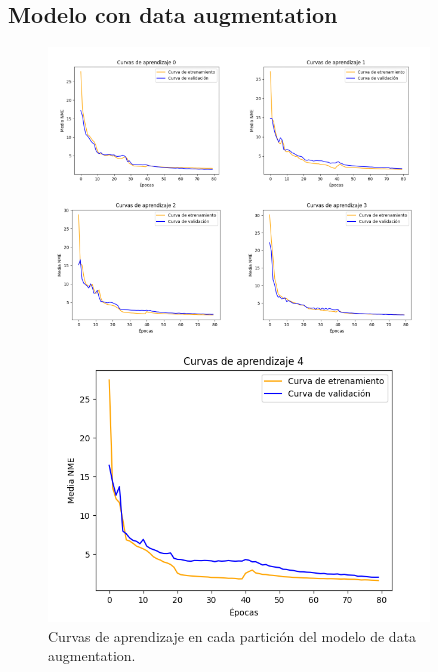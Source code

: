 \subsection*{Modelo con data augmentation}
\begin{figure}[H]
    \centering
    \includegraphics[width=0.9\textwidth]{img/curvas_daugmentation.png}
    \caption{Curvas de aprendizaje en cada partición del modelo de data augmentation.}
    \label{fig:curvas_daugmentation}
\end{figure}

\endinput
